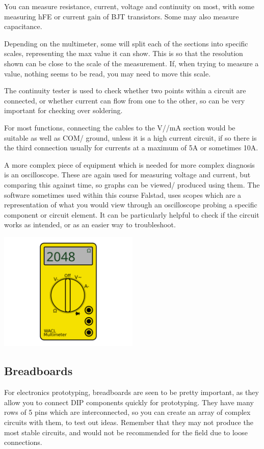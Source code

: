 \documentclass[a4paper,11pt]{report}
\begin{document}
You can measure resistance, current, voltage and continuity on most, with some measuring hFE or current gain of BJT transistors. Some may also measure capacitance.

Depending on the multimeter, some will split each of the sections into specific scales, representing the max value it can show. This is so that the resolution shown can be close to the scale of the measurement. If, when trying to measure a value, nothing seems to be read, you may need to move this scale.

The continuity tester is used to check whether two points within a circuit are connected, or whether current can flow from one to the other, so can be very important for checking over soldering.

For most functions, connecting the cables to the V/\ohm/mA section would be suitable as well as COM/ ground, unless it is a high current circuit, if so there is the third connection usually for currents at a maximum of 5A or sometimes 10A.

A more complex piece of equipment which is needed for more complex diagnosis is an oscilloscope. These are again used for measuring voltage and current, but comparing this against time, so graphs can be viewed/ produced using them. The software sometimes used within this course Falstad, uses scopes which are a representation of what you would view through an oscilloscope probing a specific component or circuit element. It can be particularly helpful to check if the circuit works as intended, or as an easier way to troubleshoot.

\includegraphics[width=0.5\textwidth]{multimeter1}

\subsection{Breadboards}

For electronics prototyping, breadboards are seen to be pretty important, as they allow you to connect DIP components quickly for prototyping. They have many rows of 5 pins which are interconnected, so you can create an array of complex circuits with them, to test out ideas. Remember that they may not produce the most stable circuits, and would not be recommended for the field due to loose connections.
\end{document}
